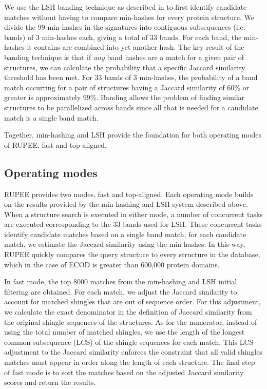 \documentclass[10pt,letterpaper]{article}
\begin{document}
We use the LSH banding technique as described in \cite{Rajaraman2012} to first identify candidate matches without having to compare min-hashes for every protein structure. 
We divide the 99 min-hashes in the signatures into contiguous subsequences (i.e. bands) of 3 min-hashes each, giving a total of 33 bands. 
For each band, the min-hashes it contains are combined into yet another hash. 
The key result of the banding technique is that if \emph{any} band hashes are a match for a given pair of structures, we can calculate the probability that a specific Jaccard similarity threshold has been met.
For 33 bands of 3 min-hashes, the probability of a band match occurring for a pair of structures having a Jaccard similarity of 60\% or greater is approximately 99\%. 
Banding allows the problem of finding similar structures to be parallelized across bands since all that is needed for a candidate match is a single band match. 

Together, min-hashing and LSH provide the foundation for both operating modes of RUPEE, fast and top-aligned.

\subsection*{Operating modes}

RUPEE provides two modes, fast and top-aligned. 
Each operating mode builds on the results provided by the min-hashing and LSH system described above. 
When a structure search is executed in either mode, a number of concurrent tasks are executed corresponding to the 33 bands used for LSH. 
These concurrent tasks identify candidate matches based on a single band match; for each candidate match, we estimate the Jaccard similarity using the min-hashes. 
In this way, RUPEE quickly compares the query structure to every structure in the database, which in the case of ECOD is greater than 600,000 protein domains.

In fast mode, the top 8000 matches from the min-hashing and LSH initial filtering are obtained.
For each match, we adjust the Jaccard similarity to account for matched shingles that are out of sequence order. 
For this adjustment, we calculate the exact denominator in the definition of Jaccard similarity from the original shingle sequences of the structures.
As for the numerator, instead of using the total number of matched shingles, we use the length of the longest common subsequence (LCS) of the shingle sequences for each match. 
This LCS adjustment to the Jaccard similarity enforces the constraint that all valid shingles matches must appear in order along the length of each structure. 
The final step of fast mode is to sort the matches based on the adjusted Jaccard similarity scores and return the results. 
\end{document}
